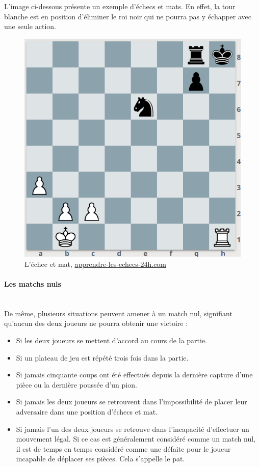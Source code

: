 \huge\documentclass{article}
\begin{document}
L'image ci-dessous présente un exemple d'échecs et mats. En effet, la tour blanche est en position d'éliminer le roi noir qui ne pourra pas y échapper avec une seule action.\newline

\begin{figure}[!h]
\centering
\includegraphics[scale=0.5]{img/echec-et-mat.png}
\caption{L'échec et mat,
\href{https://www.apprendre-les-echecs-24h.com/blog/echec-et-mat/}{apprendre-les-echecs-24h.com}}
\end{figure}

\paragraph{Les matchs nuls}
~~\\

De même, plusieurs situations peuvent amener à un match nul, signifiant qu'aucun des deux joueurs ne pourra obtenir une victoire :

\begin{itemize}
    \item Si les deux joueurs se mettent d'accord au cours de la partie.
    \item Si un plateau de jeu est répété trois fois dans la partie.
    \item Si jamais cinquante coups ont été effectués depuis la dernière capture d'une pièce ou la dernière poussée d'un pion.
    \item Si jamais les deux joueurs se retrouvent dans l'impossibilité de placer leur adversaire dans une position d'échecs et mat.
    \item Si jamais l'un des deux joueurs se retrouve dans l'incapacité d'effectuer un mouvement légal. Si ce cas est généralement considéré comme un match nul, il est de temps en temps considéré comme une défaite pour le joueur incapable de déplacer ses pièces. Cela s'appelle le pat.
\end{itemize}
\end{document}
